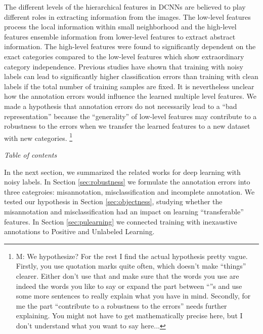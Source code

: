 \noindent
The different levels of the hierarchical features in DCNNs are believed to play different roles in extracting information from the images.
The low-level features process the local information within small neighborhood and the high-level features ensemble information from lower-level features to extract abstract information.
The high-level features were found to significantly dependent on the exact categories compared to the low-level features which show extraordinary category independence.\cite{yosinski2014transferable}
Previous studies\cite{sukhbaatar2014training,patrini2016making} have shown that training with noisy labels can lead to significantly higher classification errors than training with clean labels if the total number of training samples are fixed.
It is nevertheless unclear how the annotation errors would influence the learned multiple level features.
We made a hypothesis that annotation errors do not necessarily lead to a ``bad representation'' because the ``generality'' of low-level features may contribute to a robustness to the errors when we transfer the learned features to a new dataset with new categories.
\footnote{M: We hypothesize?
For the rest I find the actual hypothesis pretty vague.  Firstly, you use quotation marks quite often, which doesn't make ``things'' clearer.  Either don't use that and make sure that the words you use are indeed the words you like to say or expand the part between ``''s and use some more sentences to really explain what you have in  mind.  Secondly, for me the part ``contribute to a robustness to the errors'' needs further explaining.  You might not have to get mathematically precise here, but I don't understand what you want to say here...}

\noindent
\textit{Table of contents}

\noindent
In the next section, we summarized the related works for deep learning with noisy labels.
In Section \ref{sec:robustness} we formulate the annotation errors into three categroies: misannotation, misclassification and incomplete annotation.
We tested our hypothesis in Section \ref{sec:objectness}, studying whether the misannotation and misclassification had an impact on learning ``transferable'' features.
In Section \ref{sec:pulearning} we connected training with inexaustive annotations to Positive and Unlabeled Learning.


%
